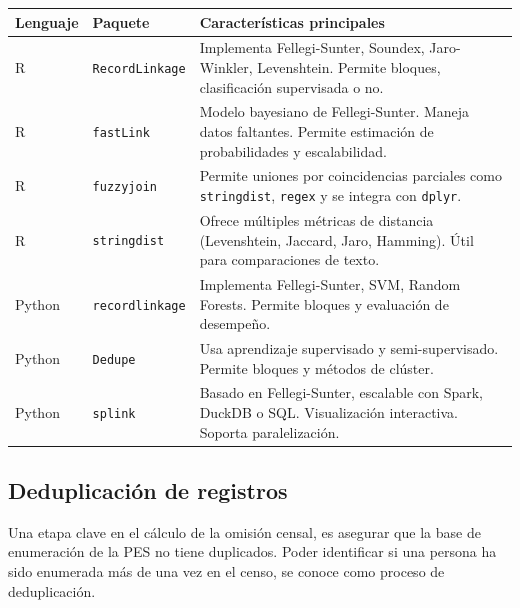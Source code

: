 \documentclass[
  12pt,
]{book}
\begin{document}
\begin{longtable}[]{@{}
  >{\raggedright\arraybackslash}p{}
  >{\raggedright\arraybackslash}p{}
  >{\raggedright\arraybackslash}p{}@{}}
\toprule\noalign{}
\begin{minipage}[b]{\linewidth}\raggedright
Lenguaje
\end{minipage} & \begin{minipage}[b]{\linewidth}\raggedright
Paquete
\end{minipage} & \begin{minipage}[b]{\linewidth}\raggedright
Características principales
\end{minipage} \\
\midrule\noalign{}
\endhead
\bottomrule\noalign{}
\endlastfoot
R & \texttt{RecordLinkage} & Implementa Fellegi-Sunter, Soundex, Jaro-Winkler, Levenshtein. Permite bloques, clasificación supervisada o no. \\
R & \texttt{fastLink} & Modelo bayesiano de Fellegi-Sunter. Maneja datos faltantes. Permite estimación de probabilidades y escalabilidad. \\
R & \texttt{fuzzyjoin} & Permite uniones por coincidencias parciales como \texttt{stringdist}, \texttt{regex} y se integra con \texttt{dplyr}. \\
R & \texttt{stringdist} & Ofrece múltiples métricas de distancia (Levenshtein, Jaccard, Jaro, Hamming). Útil para comparaciones de texto. \\
Python & \texttt{recordlinkage} & Implementa Fellegi-Sunter, SVM, Random Forests. Permite bloques y evaluación de desempeño. \\
Python & \texttt{Dedupe} & Usa aprendizaje supervisado y semi-supervisado. Permite bloques y métodos de clúster. \\
Python & \texttt{splink} & Basado en Fellegi-Sunter, escalable con Spark, DuckDB o SQL. Visualización interactiva. Soporta paralelización. \\
\end{longtable}

\subsection{Deduplicación de registros}\label{deduplicaciuxf3n-de-registros}

Una etapa clave en el cálculo de la omisión censal, es asegurar que la base de enumeración de la PES no tiene duplicados. Poder identificar si una persona ha sido enumerada más de una vez en el censo, se conoce como proceso de deduplicación.
\end{document}

